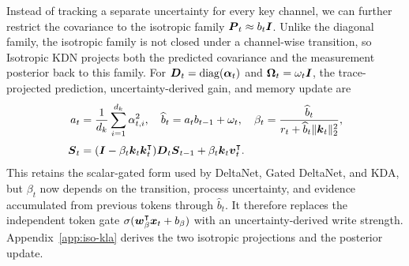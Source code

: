 \documentclass{article} %
\begin{document}
Instead of tracking a separate uncertainty for every key channel, we can further restrict the
covariance to the isotropic family $\boldsymbol{P}_t\approx b_t\boldsymbol{I}$. Unlike the diagonal family, the
isotropic family is not closed under a channel-wise transition, so Isotropic KDN projects both the
predicted covariance and the measurement posterior back to this family. For
$\boldsymbol{D}_t=\operatorname{diag}(\boldsymbol{\alpha}_t)$ and $\boldsymbol{\Omega}_t=\omega_t\boldsymbol{I}$, the trace-projected
prediction, uncertainty-derived gain, and memory update are
\begin{equation}
\begin{aligned}
  a_t
  &=\frac{1}{d_k}\sum_{i=1}^{d_k}\alpha_{t,i}^2,
  \quad
  \widehat b_t
  =a_t b_{t-1}+\omega_t,
  \quad
  \beta_t
  =\frac{\widehat b_t}{r_t+\widehat b_t\|\boldsymbol{k}_t\|_2^2},
  \\[3pt]
  \boldsymbol{S}_t
  &=(\boldsymbol{I}-\beta_t\boldsymbol{k}_t\boldsymbol{k}_t^{\intercal})\boldsymbol{D}_t\boldsymbol{S}_{t-1}
    +\beta_t\boldsymbol{k}_t\boldsymbol{v}_t^{\intercal}.
\end{aligned}
  \label{eq:main-iso-kdn-gain}
\end{equation}
This retains the scalar-gated form used by DeltaNet, Gated DeltaNet, and KDA, but $\beta_t$ now
depends on the transition, process uncertainty, and evidence accumulated from previous tokens
through $\widehat b_t$. It therefore replaces the independent token gate
$\sigma(\boldsymbol{w}_{\beta}^{\intercal}\boldsymbol{x}_t+b_{\beta})$ with an uncertainty-derived write strength.
Appendix~\ref{app:iso-kla} derives the two isotropic projections and the posterior update.
\end{document}
